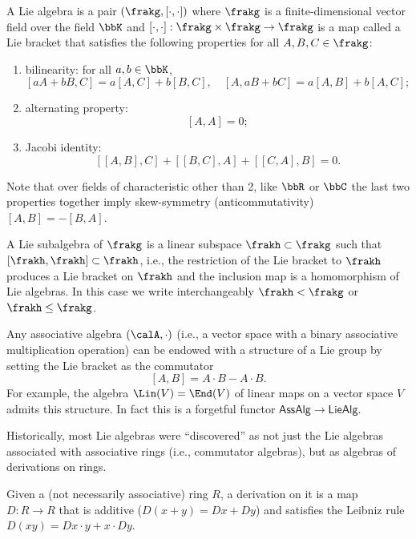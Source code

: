 \begin{defn}
    A Lie algebra is a pair $(\frakg,[\cdot,\cdot])$ where $\frakg$ is a finite-dimensional vector field over the field $\bbK$ and $[\cdot,\cdot]:\frakg\times\frakg\to\frakg$ is a map called a Lie bracket that satisfies the following properties for all $A,B,C\in \frakg$:
    \begin{enumerate}
        \item bilinearity: for all $a,b\in \bbK$,
        \[[aA+bB,C]=a[A,C]+b[B,C],\quad [A,aB+bC]=a[A,B]+b[A,C];\]
        \item alternating property:
        \[[A,A]=0;\]
        \item Jacobi identity:
        \[[[A,B],C]+[[B,C],A]+[[C,A],B]=0.\]
    \end{enumerate}
    Note that over fields of characteristic other than 2, like $\bbR$ or $\bbC$ the last two properties together imply skew-symmetry (anticommutativity) $[A,B]=-[B,A]$.

    A Lie subalgebra of $\frakg$ is a linear subspace $\frakh\subset\frakg$ such that $[\frakh,\frakh]\subset\frakh$, i.e., the restriction of the Lie bracket to $\frakh$ produces a Lie bracket on $\frakh$ and the inclusion map is a homomorphism of Lie algebras. In this case we write interchangeably $\frakh< \frakg$ or $\frakh\leq \frakg$.\index{$<$}
\end{defn}


\begin{example}
    Any associative algebra $(\calA,\cdot)$ (i.e., a vector space with a binary associative multiplication operation) can be endowed with a structure of a Lie group by setting the Lie bracket as the commutator
    \[[A,B]=A\cdot B-A\cdot B.\]
    For example, the algebra $\Lin(V)=\End(V)$ of linear maps on a vector space $V$ admits this structure. In fact this is a forgetful functor $\mathsf{AssAlg}\to\mathsf{LieAlg}$.
\end{example}

Historically, most Lie algebras were ``discovered'' as not just the Lie algebras associated with associative rings (i.e., commutator algebras), but as algebras of derivations on rings.

\begin{defn}[Derivation]
    Given a (not necessarily associative) ring $R$, a derivation on it is a map $D:R\to R$ that is additive ($D(x+y)=Dx+Dy$) and satisfies the Leibniz rule $D(xy)=Dx\cdot y+x\cdot Dy$.
\end{defn}

